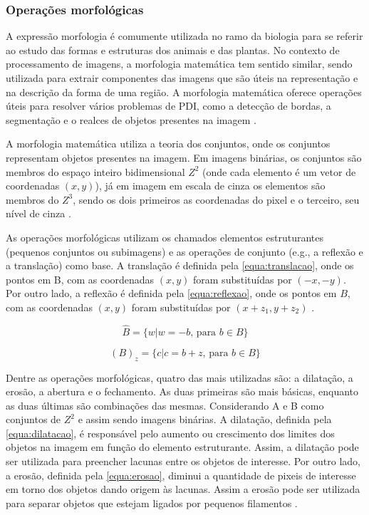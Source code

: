 \documentclass[12pt, a4paper, english, brazil]{article}
\begin{document}
\subsubsection{Operações morfológicas}

A expressão morfologia é comumente utilizada no ramo da biologia para se referir ao estudo das formas e estruturas dos animais e das plantas. No contexto de processamento de imagens, a morfologia matemática tem sentido similar, sendo utilizada para extrair componentes das imagens que são úteis na representação e na descrição da forma de uma região. A morfologia matemática oferece operações úteis para resolver vários problemas de PDI, como a detecção de bordas, a segmentação e o realces de objetos presentes na imagem \cite{Marques_Filho_1999}.

A morfologia matemática utiliza a teoria dos conjuntos, onde os conjuntos representam objetos presentes na imagem. Em imagens binárias, os conjuntos são membros do espaço inteiro bidimensional $Z^2$ (onde cada elemento é um vetor de coordenadas $(x, y)$), já em imagem em escala de cinza os elementos são membros do $Z^3$, sendo os dois primeiros as coordenadas do pixel e o terceiro, seu nível de cinza \cite{Gonzalez_Woods_2010}.

As operações morfológicas utilizam os chamados elementos estruturantes (pequenos conjuntos ou subimagens) e as operações de conjunto (e.g., a reflexão e a translação) como base. A translação é definida pela \autoref{equa:translacao}, onde os pontos em B, com as coordenadas $(x, y)$ foram substituídas por $(-x, -y)$. Por outro lado, a reflexão é definida pela \autoref{equa:reflexao}, onde os pontos em $B$, com as coordenadas $(x, y)$ foram substituídas por $(x + z_1, y + z_2)$ \cite{AlAzawee_2015}.

\begin{equation}
    \hat{B} = \{w | w = -b\text{, para } b \in B\}
    \label{equa:translacao}
\end{equation}

\begin{equation}
    (B)_z = \{c | c = b + z\text{, para } b \in B\}
    \label{equa:reflexao}
\end{equation}

Dentre as operações morfológicas, quatro das mais utilizadas são: a dilatação, a erosão, a abertura e o fechamento. As duas primeiras são mais básicas, enquanto as duas últimas são combinações das mesmas. Considerando A e B como conjuntos de $Z^2$ e assim sendo imagens binárias. A dilatação, definida pela \autoref{equa:dilatacao}, é responsável pelo aumento ou crescimento dos limites dos objetos na imagem em função do elemento estruturante. Assim, a dilatação pode ser utilizada para preencher lacunas entre os objetos de interesse. Por outro lado, a erosão, definida pela \autoref{equa:erosao}, diminui a quantidade de pixeis de interesse em torno dos objetos dando origem às lacunas. Assim a erosão pode ser utilizada para separar objetos que estejam ligados por pequenos filamentos \cite{Marques_Filho_1999}.
\end{document}
